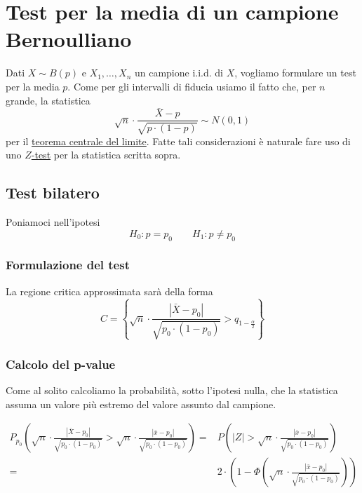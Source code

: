 \section{Test per la media di un campione Bernoulliano}
Dati $X \sim B(p)$ e $X_1, \dots, X_n$ un campione i.i.d. di $X$, vogliamo formulare un test per la
media $p$. Come per gli intervalli di fiducia usiamo il fatto che, per $n$ grande, la statistica
\[ \sqrt{n} \cdot \frac{\bar{X} - p}{\sqrt{p \cdot (1-p)}} \sim N(0,1) \]
per il \hyperref[th: tcl]{teorema centrale del limite}. Fatte tali considerazioni è naturale fare
uso di uno \hyperref[sec: z-test]{$Z$-test} per la statistica scritta sopra.

\subsection{Test bilatero}
Poniamoci nell'ipotesi
\[ H_0: p = p_0 \qquad H_1: p \neq p_0 \]

\subsubsection{Formulazione del test}
La regione critica approssimata sarà della forma
\[
	C = \left\{ \sqrt{n} \cdot \frac{|\bar{X} - p_0|}{\sqrt{p_0 \cdot (1-p_0)}} >
	q_{1 - \frac{\alpha}{2}}\right\}
\]

\subsubsection{Calcolo del p-value}
Come al solito calcoliamo la probabilità, sotto l'ipotesi nulla, che la statistica assuma un valore
più estremo del valore assunto dal campione.

\begin{align*}
	P_{p_0} \left( \sqrt{n} \cdot \frac{|\bar{X} - p_0|}{\sqrt{p_0 \cdot (1-p_0)}} >
	\sqrt{n} \cdot \frac{|\bar{x} - p_0|}{\sqrt{p_0 \cdot (1-p_0)}} \right) = &
	P \left( |Z| > \sqrt{n} \cdot \frac{|\bar{x} - p_0|}{\sqrt{p_0 \cdot (1-p_0)}} \right) \\
	=                                                                         &
	2 \cdot \left( 1 - \Phi \left( \sqrt{n} \cdot
		\frac{|\bar{x} - p_0|}{\sqrt{p_0 \cdot (1-p_0)}} \right) \right)
\end{align*}

